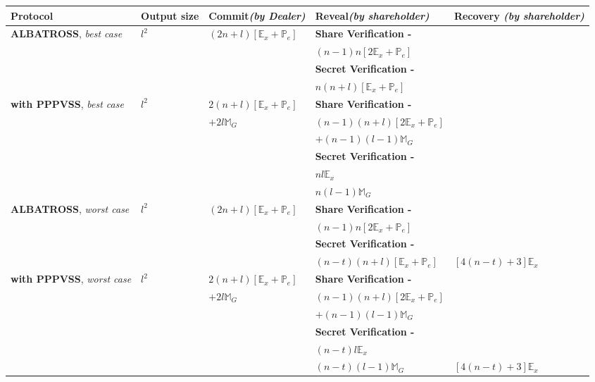 \begin{table}[H]
\centering
\begin{tabular}{|p{3cm}|p{1.2cm}|p{2.5cm}|p{5.5cm}|p{2.5cm}|}
\hline
\textbf{Protocol}    & \textbf{Output size}    & 
\textbf{Commit}\textit{(by Dealer)} & \textbf{Reveal}\textit{(by 
shareholder)} & \textbf{Recovery} \textit{(by shareholder)}                                                           
\\ \hline
\textbf{ALBATROSS}, \textit{best case}    & $l^2$ & 
$(2n+l)[\mathbb{E}_x+\mathbb{P}_e]$ & \textbf{Share Verification - }  &  
\\
& & & $(n-1)n[2\mathbb{E}_x+\mathbb{P}_e]$ & \\
& & & \textbf{Secret Verification - } & \\ 
& & & $n(n+l)[\mathbb{E}_x+\mathbb{P}_e]$& \\ \hline
\textbf{with PPPVSS}, \textit{best case}    & $l^2$  & 
$2(n+l)[\mathbb{E}_x+\mathbb{P}_e]$ & \textbf{Share Verification - } &  \\ 
& & $+2l\mathbb{M}_G$ & $(n-1)(n+l)[2\mathbb{E}_x+\mathbb{P}_e]$ &  \\ 
& & & $+(n-1)(l-1)\mathbb{M}_G$ &  \\
& & & \textbf{Secret Verification - } & \\ 
& & & $nl\mathbb{E}_x$ &   \\
& & & $n(l-1)\mathbb{M}_G$ &  \\ \hline
\textbf{ALBATROSS}, \textit{worst case}    & $l^2$ & 
$(2n+l)[\mathbb{E}_x+\mathbb{P}_e]$ & \textbf{Share Verification - }  &  
\\
& & & $(n-1)n[2\mathbb{E}_x+\mathbb{P}_e]$ & \\
& & & \textbf{Secret Verification - } & \\ 
& & & $(n-t)(n+l)[\mathbb{E}_x+\mathbb{P}_e]$& 
$[4(n-t)+3]\mathbb{E}_{x}$\\ \hline
\textbf{with PPPVSS}, \textit{worst case}    & $l^2$  & 
$2(n+l)[\mathbb{E}_x+\mathbb{P}_e]$ & \textbf{Share Verification - } &  \\ 
& & $+2l\mathbb{M}_G$ & $(n-1)(n+l)[2\mathbb{E}_x+\mathbb{P}_e]$ &  \\ 
& & & $+(n-1)(l-1)\mathbb{M}_G$ &  \\
& & & \textbf{Secret Verification - } & \\ 
& & & $(n-t)l\mathbb{E}_x$ &   \\
& & & $(n-t)(l-1)\mathbb{M}_G$ & $[4(n-t)+3]\mathbb{E}_{x}$  \\ \hline


\end{tabular}
\end{table}
